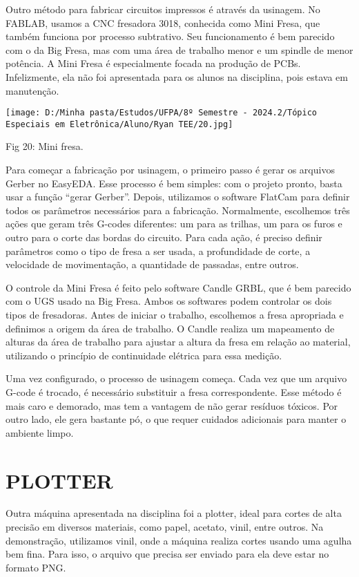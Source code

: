 \documentclass[
]{book}
\begin{document}
Outro método para fabricar circuitos impressos é através da usinagem. No FABLAB, usamos a CNC fresadora 3018, conhecida como Mini Fresa, que também funciona por processo subtrativo. Seu funcionamento é bem parecido com o da Big Fresa, mas com uma área de trabalho menor e um spindle de menor potência. A Mini Fresa é especialmente focada na produção de PCBs. Infelizmente, ela não foi apresentada para os alunos na disciplina, pois estava em manutenção.

\texttt{[image: D:/Minha pasta/Estudos/UFPA/8º Semestre - 2024.2/Tópico Especiais em Eletrônica/Aluno/Ryan TEE/20.jpg]}

Fig 20: Mini fresa.

Para começar a fabricação por usinagem, o primeiro passo é gerar os arquivos Gerber no EasyEDA. Esse processo é bem simples: com o projeto pronto, basta usar a função ``gerar Gerber''. Depois, utilizamos o software FlatCam para definir todos os parâmetros necessários para a fabricação. Normalmente, escolhemos três ações que geram três G-codes diferentes: um para as trilhas, um para os furos e outro para o corte das bordas do circuito. Para cada ação, é preciso definir parâmetros como o tipo de fresa a ser usada, a profundidade de corte, a velocidade de movimentação, a quantidade de passadas, entre outros.

O controle da Mini Fresa é feito pelo software Candle GRBL, que é bem parecido com o UGS usado na Big Fresa. Ambos os softwares podem controlar os dois tipos de fresadoras. Antes de iniciar o trabalho, escolhemos a fresa apropriada e definimos a origem da área de trabalho. O Candle realiza um mapeamento de alturas da área de trabalho para ajustar a altura da fresa em relação ao material, utilizando o princípio de continuidade elétrica para essa medição.

Uma vez configurado, o processo de usinagem começa. Cada vez que um arquivo G-code é trocado, é necessário substituir a fresa correspondente. Esse método é mais caro e demorado, mas tem a vantagem de não gerar resíduos tóxicos. Por outro lado, ele gera bastante pó, o que requer cuidados adicionais para manter o ambiente limpo.

\chapter{PLOTTER}\label{plotter}

Outra máquina apresentada na disciplina foi a plotter, ideal para cortes de alta precisão em diversos materiais, como papel, acetato, vinil, entre outros. Na demonstração, utilizamos vinil, onde a máquina realiza cortes usando uma agulha bem fina. Para isso, o arquivo que precisa ser enviado para ela deve estar no formato PNG.
\end{document}
